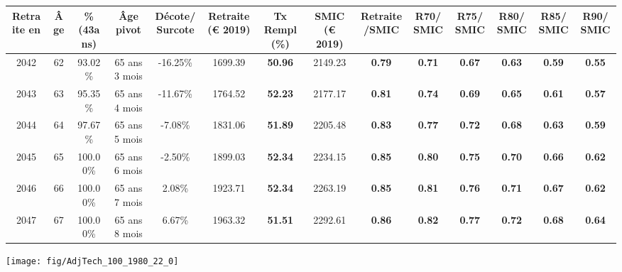 \begin{adjustbox}{max width=\textwidth} 
\begin{tabular}[htb]{|c|c||c|c|c||c|c||c|c||c|c|c|c|c|} 
\hline 
 Retraite en &  Âge &  \%(43ans) &  Âge pivot &  Décote/Surcote &  Retraite (\euro{} 2019) &  Tx Rempl(\%) &  SMIC (\euro{} 2019) &  Retraite/SMIC &  R70/SMIC &  R75/SMIC &  R80/SMIC &  R85/SMIC &  R90/SMIC \\ 
\hline \hline 
 2042 &  62 &  93.02\% &  65 ans 3 mois &  -16.25\% &  1699.39 &  {\bf 50.96} &  2149.23 &  {\bf {\color{red} 0.79}} &  {\bf {\color{red} 0.71}} &  {\bf {\color{red} 0.67}} &  {\bf {\color{red} 0.63}} &  {\bf {\color{red} 0.59}} &  {\bf {\color{red} 0.55}} \\ 
\hline 
 2043 &  63 &  95.35\% &  65 ans 4 mois &  -11.67\% &  1764.52 &  {\bf 52.23} &  2177.17 &  {\bf {\color{red} 0.81}} &  {\bf {\color{red} 0.74}} &  {\bf {\color{red} 0.69}} &  {\bf {\color{red} 0.65}} &  {\bf {\color{red} 0.61}} &  {\bf {\color{red} 0.57}} \\ 
\hline 
 2044 &  64 &  97.67\% &  65 ans 5 mois &  -7.08\% &  1831.06 &  {\bf 51.89} &  2205.48 &  {\bf {\color{red} 0.83}} &  {\bf {\color{red} 0.77}} &  {\bf {\color{red} 0.72}} &  {\bf {\color{red} 0.68}} &  {\bf {\color{red} 0.63}} &  {\bf {\color{red} 0.59}} \\ 
\hline 
 2045 &  65 &  100.00\% &  65 ans 6 mois &  -2.50\% &  1899.03 &  {\bf 52.34} &  2234.15 &  {\bf {\color{red} 0.85}} &  {\bf {\color{red} 0.80}} &  {\bf {\color{red} 0.75}} &  {\bf {\color{red} 0.70}} &  {\bf {\color{red} 0.66}} &  {\bf {\color{red} 0.62}} \\ 
\hline 
 2046 &  66 &  100.00\% &  65 ans 7 mois &  2.08\% &  1923.71 &  {\bf 52.34} &  2263.19 &  {\bf {\color{red} 0.85}} &  {\bf {\color{red} 0.81}} &  {\bf {\color{red} 0.76}} &  {\bf {\color{red} 0.71}} &  {\bf {\color{red} 0.67}} &  {\bf {\color{red} 0.62}} \\ 
\hline 
 2047 &  67 &  100.00\% &  65 ans 8 mois &  6.67\% &  1963.32 &  {\bf 51.51} &  2292.61 &  {\bf {\color{red} 0.86}} &  {\bf {\color{red} 0.82}} &  {\bf {\color{red} 0.77}} &  {\bf {\color{red} 0.72}} &  {\bf {\color{red} 0.68}} &  {\bf {\color{red} 0.64}} \\ 
\hline 
\hline 
\end{tabular} 
\end{adjustbox} 
 
 \vspace{0.1cm} 

 {\hspace{-2.2cm}\texttt{[image: fig/AdjTech\_100\_1980\_22\_0]}} 

